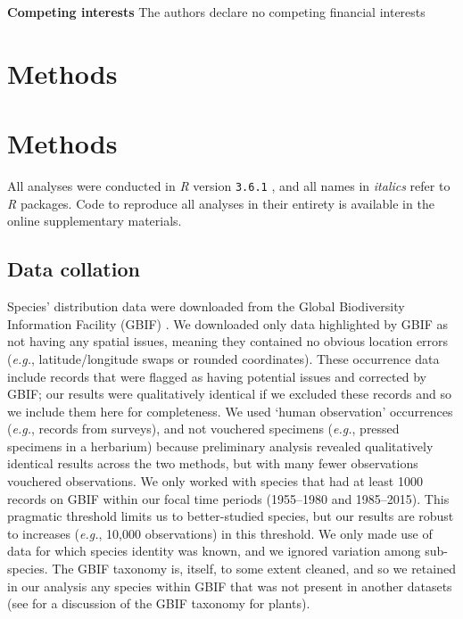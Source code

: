 \documentclass[12pt]{report}
\begin{document}
\textbf{Competing interests} The authors declare no competing
financial interests

\clearpage

\section*{\Large Methods}
\section*{\Large Methods}
\renewcommand{\figurename}{Extended Data Figure}
\renewcommand{\tablename}{Extended Data Table}
  
All analyses were conducted in \emph{R} version \texttt{3.6.1}
\autocite{R2018}, and all names in \emph{italics} refer to \emph{R}
packages. Code to reproduce all analyses in their entirety is
available in the online supplementary materials.

\subsection*{Data collation}

Species' distribution data were downloaded from the Global
Biodiversity Information Facility (GBIF)
\supercite{url_gbif,url_gbif_occurrences}. We downloaded only data
highlighted by GBIF as not having any spatial issues, meaning they
contained no obvious location errors (\emph{e.g.}, latitude/longitude
swaps or rounded coordinates). These occurrence data include records
that were flagged as having potential issues and corrected by GBIF;
our results were qualitatively identical if we excluded these records
and so we include them here for completeness. We used `human
observation' occurrences (\emph{e.g.}, records from surveys), and not
vouchered specimens (\emph{e.g.}, pressed specimens in a herbarium)
because preliminary analysis revealed qualitatively identical results
across the two methods, but with many fewer observations vouchered
observations. We only worked with species that had at least 1000
records on GBIF within our focal time periods (1955--1980 and
1985--2015). This pragmatic threshold limits us to better-studied
species, but our results are robust to increases (\emph{e.g.}, 10,000
observations) in this threshold. We only made use of data for which
species identity was known, and we ignored variation among
sub-species. The GBIF taxonomy is, itself, to some extent cleaned, and
so we retained in our analysis any species within GBIF that was not
present in another datasets (see
\citeauthor{Cornwell2019}\supercite{Cornwell2019} for a discussion of
the GBIF taxonomy for plants).
\end{document}
